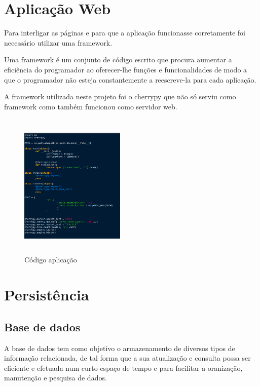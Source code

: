 \documentclass{report}
\begin{document}
\clearpage

\chapter{Aplicação Web}
\label{chap.3}
\par 
Para interligar as páginas e para que a aplicação funcionasse corretamente foi necessário utilizar uma framework.
\par 
Uma framework é um conjunto de código escrito que procura aumentar a eficiência do programador ao oferecer-lhe funções e funcionalidades de modo a que o programador não esteja constantemente a reescreve-la para cada aplicação.
\par
A framework utilizada neste projeto foi o cherrypy que não só serviu como framework como também funcionou como servidor web.

\begin{figure}[h]
\begin{center}
\includegraphics[width = 5cm, height= 7cm]{app.png}
  \caption{Código aplicação}
  \label{fig:boat1}
\end{center}
  
\end{figure}


\chapter{Persistência}
\label{chap.4}
\section{Base de dados}
\par A base de dados tem como objetivo o armazenamento de diversos tipos de informação relacionada, de tal forma que a sua atualização e consulta possa ser eficiente e efetuada num curto espaço de tempo e para facilitar a oranização, manutenção e pesquisa de dados. \par
\end{document}
